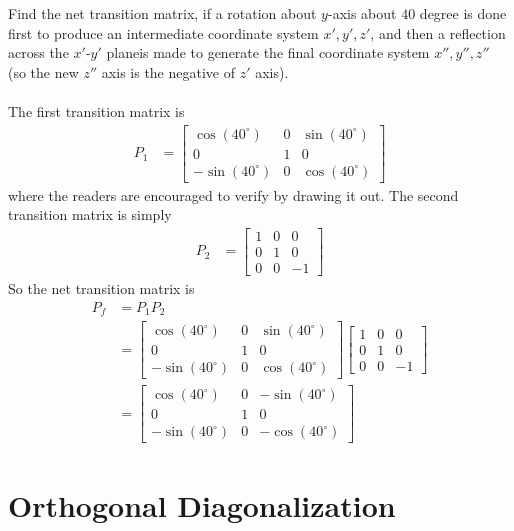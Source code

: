 \begin{exmp}
Find the net transition matrix, if a rotation about $y$-axis about $40$ degree is done first to produce an intermediate coordinate system $x', y', z'$, and then a reflection across the $x'$-$y'$ planeis made to generate the final coordinate system $x'', y'', z''$ (so the new $z''$ axis is the negative of $z'$ axis).\\
\\
The first transition matrix is
\begin{align*}
P_1
&= 
\begin{bmatrix}
\cos(40^\circ) & 0 & \sin(40^\circ) \\
0 & 1 & 0 \\
-\sin(40^\circ) & 0 & \cos(40^\circ)
\end{bmatrix}
\end{align*}
where the readers are encouraged to verify by drawing it out. The second transition matrix is simply
\begin{align*}
P_2
&= 
\begin{bmatrix}
1 & 0 & 0 \\
0 & 1 & 0 \\
0 & 0 & -1
\end{bmatrix}    
\end{align*}
So the net transition matrix is
\begin{align*}
P_f &= P_1P_2 \\
&= 
\begin{bmatrix}
\cos(40^\circ) & 0 & \sin(40^\circ) \\
0 & 1 & 0 \\
-\sin(40^\circ) & 0 & \cos(40^\circ)
\end{bmatrix}
\begin{bmatrix}
1 & 0 & 0 \\
0 & 1 & 0 \\
0 & 0 & -1
\end{bmatrix} \\
&= 
\begin{bmatrix}
\cos(40^\circ) & 0 & -\sin(40^\circ) \\
0 & 1 & 0 \\
-\sin(40^\circ) & 0 & -\cos(40^\circ)
\end{bmatrix}
\end{align*}
\end{exmp}

\section{Orthogonal Diagonalization}

